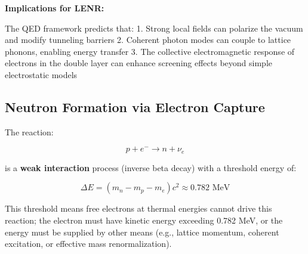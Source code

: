 \documentclass[11pt,a4paper]{article}
\begin{document}
\textbf{Implications for LENR:}

The QED framework predicts that: 1. Strong local fields can polarize the vacuum and modify tunneling barriers 2. Coherent photon modes can couple to lattice phonons, enabling energy transfer 3. The collective electromagnetic response of electrons in the double layer can enhance screening effects beyond simple electrostatic models

\subsection{Neutron Formation via Electron Capture}

The reaction:

\begin{equation}
p + e^- \longrightarrow n + \nu_e
\end{equation}

is a \textbf{weak interaction} process (inverse beta decay) with a threshold energy of:

\begin{equation}
\Delta E = (m_n - m_p - m_e)c^2 \approx 0.782 \text{ MeV}
\end{equation}

This threshold means free electrons at thermal energies cannot drive this reaction; the electron must have kinetic energy exceeding 0.782 MeV, or the energy must be supplied by other means (e.g., lattice momentum, coherent excitation, or effective mass renormalization).
\end{document}
